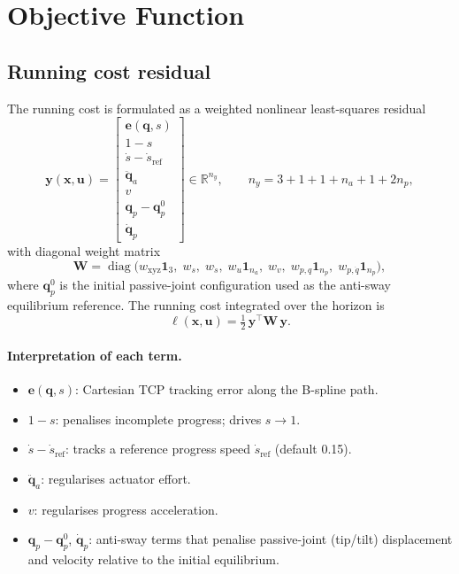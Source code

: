 \documentclass[11pt, a4paper]{article}
\newcommand{\R}{\mathbb{R}}
\newcommand{\qd}{\bm{q}}          %
\newcommand{\dqd}{\dot{\bm{q}}}   %
\newcommand{\qp}{\bm{q}_p}        %
\newcommand{\diag}{\operatorname{diag}}
\begin{document}
\section{Objective Function}

\subsection{Running cost residual}

The running cost is formulated as a weighted nonlinear least-squares residual
\begin{equation}
  \bm{y}(\bm{x}, \bm{u}) =
  \begin{bmatrix}
    \bm{e}(\qd, s)         \\[2pt]
    1 - s                  \\[2pt]
    \dot{s} - \dot{s}_\mathrm{ref} \\[2pt]
    \ddot{\bm{q}}_a        \\[2pt]
    v                      \\[2pt]
    \qp - \qp^0            \\[2pt]
    \dqd_p
  \end{bmatrix}
  \in \R^{n_y},
  \qquad
  n_y = 3 + 1 + 1 + n_a + 1 + 2n_p,
\end{equation}
with diagonal weight matrix
\begin{equation}
  \bm{W} = \diag\bigl(
    w_\mathrm{xyz}\bm{1}_3,\;
    w_s,\;
    w_{\dot{s}},\;
    w_u\bm{1}_{n_a},\;
    w_v,\;
    w_{p,q}\bm{1}_{n_p},\;
    w_{p,\dot{q}}\bm{1}_{n_p}
  \bigr),
\end{equation}
where $\qp^0$ is the initial passive-joint configuration used as the anti-sway
equilibrium reference. The running cost integrated over the horizon is
\begin{equation}
  \ell(\bm{x},\bm{u}) = \tfrac{1}{2}\,\bm{y}^\top \bm{W}\, \bm{y}.
\end{equation}

\paragraph{Interpretation of each term.}
\begin{itemize}
  \item $\bm{e}(\qd,s)$: Cartesian TCP tracking error along the B-spline path.
  \item $1-s$: penalises incomplete progress; drives $s \to 1$.
  \item $\dot{s} - \dot{s}_\mathrm{ref}$: tracks a reference progress speed
        $\dot{s}_\mathrm{ref}$ (default 0.15).
  \item $\ddot{\bm{q}}_a$: regularises actuator effort.
  \item $v$: regularises progress acceleration.
  \item $\qp - \qp^0$, $\dqd_p$: anti-sway terms that penalise passive-joint
        (tip/tilt) displacement and velocity relative to the initial equilibrium.
\end{itemize}
\end{document}
